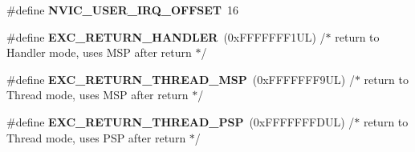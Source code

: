 \begin{DoxyCompactItemize}
\mbox{\label{group___c_m_s_i_s___core___n_v_i_c_functions_ga8045d905a5ca57437d8e6f71ffcb6df5}} 
\#define {\bfseries N\+V\+I\+C\+\_\+\+U\+S\+E\+R\+\_\+\+I\+R\+Q\+\_\+\+O\+F\+F\+S\+ET}~16
\item 
\mbox{\label{group___c_m_s_i_s___core___n_v_i_c_functions_gaa6fa2b10f756385433e08522d9e4632f}} 
\#define {\bfseries E\+X\+C\+\_\+\+R\+E\+T\+U\+R\+N\+\_\+\+H\+A\+N\+D\+L\+ER}~(0x\+F\+F\+F\+F\+F\+F\+F1\+U\+L)     /$\ast$ return to Handler mode, uses M\+S\+P after return                               $\ast$/
\item 
\mbox{\label{group___c_m_s_i_s___core___n_v_i_c_functions_gaea4703101b5e679f695e231f7ee72331}} 
\#define {\bfseries E\+X\+C\+\_\+\+R\+E\+T\+U\+R\+N\+\_\+\+T\+H\+R\+E\+A\+D\+\_\+\+M\+SP}~(0x\+F\+F\+F\+F\+F\+F\+F9\+U\+L)     /$\ast$ return to Thread mode, uses M\+S\+P after return                                $\ast$/
\item 
\mbox{\label{group___c_m_s_i_s___core___n_v_i_c_functions_ga9998daf0fbdf31dbc8f81cd604b58175}} 
\#define {\bfseries E\+X\+C\+\_\+\+R\+E\+T\+U\+R\+N\+\_\+\+T\+H\+R\+E\+A\+D\+\_\+\+P\+SP}~(0x\+F\+F\+F\+F\+F\+F\+F\+D\+U\+L)     /$\ast$ return to Thread mode, uses P\+S\+P after return                                $\ast$/
\end{DoxyCompactItemize}
